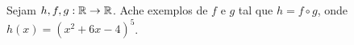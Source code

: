 Sejam $h,f,g:\mathbb{R}\rightarrow\mathbb{R}$.
Ache exemplos de $f$ e $g$ tal que $h=f\circ g$, onde $h(x)=(x^2+6x-4)^5$.
